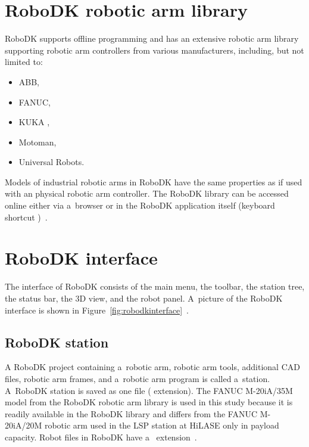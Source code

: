 \section{RoboDK robotic arm library}

RoboDK supports offline programming and has an extensive robotic arm library supporting robotic arm controllers from various manufacturers, including, but not limited to:

\begin{itemize}
    \item ABB, 
    \item FANUC, 
    \item KUKA ,
    \item Motoman, 
    \item Universal Robots.
\end{itemize}
Models of industrial robotic arms in RoboDK have the same properties as if used with an physical robotic arm controller. The RoboDK library can be accessed online either via a~browser or in the RoboDK application itself (keyboard shortcut )~\cite{robodklibrary}.


\section{RoboDK interface}

The interface of RoboDK consists of the main menu, the toolbar, the station tree, the status bar, the 3D view, and the robot panel. A~picture of the RoboDK interface is shown in Figure~\ref{fig:robodkinterface}~\cite{robodkinterface}.

\subsection{RoboDK station}

A RoboDK project containing a~robotic arm, robotic arm tools, additional CAD files, robotic arm frames, and a~robotic arm program is called a~station. A~RoboDK station is saved as one file ( extension).  The FANUC M-20iA/35M model from the RoboDK robotic arm library is used in this study because it is readily available in the RoboDK library and differs from the FANUC M-20iA/20M robotic arm used in the LSP station at HiLASE only in payload capacity. Robot files in RoboDK have a~ extension~\cite{robodkstation}.

